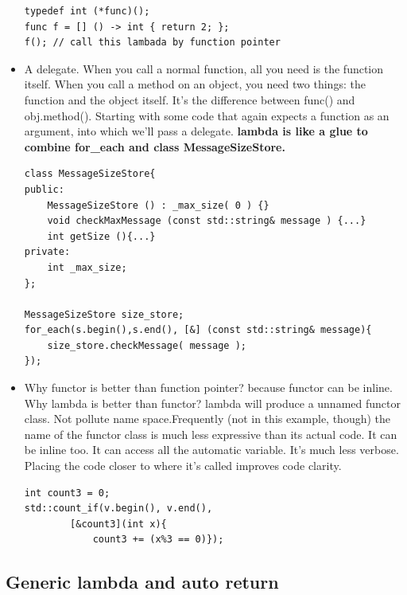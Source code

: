 \documentclass[a4paper,11pt,twoside]{book}
\begin{document}
\begin{itemize}
\begin{lstlisting}[numbers=none]
typedef int (*func)();
func f = [] () -> int { return 2; };
f(); // call this lambada by function pointer
\end{lstlisting}


\item A delegate. When you call a normal function, all you need is the function itself. When you call a method on an object, you need two things: the function and the object itself. It's the difference between func() and obj.method(). Starting with some code that again expects a function as an argument, into which we'll pass a delegate. \textbf{lambda is like a glue to combine for\_each and class MessageSizeStore.}

\begin{lstlisting}[numbers=none]
class MessageSizeStore{
public:
    MessageSizeStore () : _max_size( 0 ) {}
    void checkMaxMessage (const std::string& message ) {...}
    int getSize (){...}
private:
    int _max_size;
};

MessageSizeStore size_store;
for_each(s.begin(),s.end(), [&] (const std::string& message){
	size_store.checkMessage( message );
});
\end{lstlisting}

\item Why functor is better than function pointer? because functor can be inline. Why lambda is better than functor? lambda will produce a unnamed functor class. Not pollute name space.Frequently (not in this example, though) the name of the functor class is much less expressive than its actual code. It can be inline too. It can access all the automatic variable. It's much less verbose. Placing the code closer to where it's called improves code clarity.
\begin{lstlisting}[numbers=none]
int count3 = 0;
std::count_if(v.begin(), v.end(), 
		[&count3](int x){
			count3 += (x%3 == 0)});
\end{lstlisting}

\end{itemize}

\subsection{Generic lambda and auto return}
	
\end{document}
